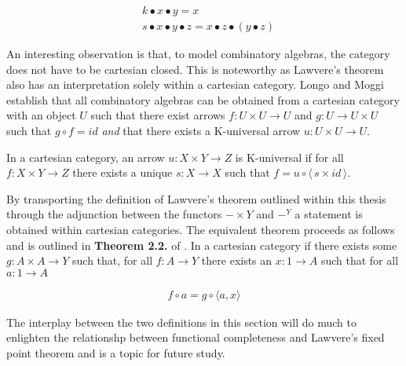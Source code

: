 \begin{align*}
    &k \bullet x \bullet y = x \\
    & s \bullet x \bullet y \bullet z = x \bullet z \bullet (y \bullet z)
\end{align*}

An interesting observation is that, to model combinatory algebras, the category
does not have to be cartesian closed.  This is noteworthy as Lawvere's theorem
also has an interpretation solely within a cartesian category. Longo and Moggi
establish that all combinatory algebras can be obtained from a cartesian
category with an object $U$ such that there exist arrows $f : U \times U
\rightarrow U$ and $g : U \rightarrow U \times U$ such that $g \circ f = id$
\textit{and} that there exists a K-universal arrow $u :U \times U
\rightarrow U$.

In a cartesian category, an arrow $u : X \times Y \rightarrow Z$ is K-universal
if for all $f : X \times Y \rightarrow Z$ there exists a unique $s : X
\rightarrow X$ such that $f = u \circ \langle \, s \times id \, \rangle$.

By transporting the definition of Lawvere's theorem outlined within this thesis
through the adjunction between the functors $-\times Y$ and $-^{Y}$ a statement
is obtained within cartesian categories. The equivalent theorem proceeds as
follows and is outlined in \textbf{Theorem 2.2.} of \cite{lawvere1969diagonal}.
In a cartesian category if there exists some $g : A \times A \rightarrow Y$ such
that, for all $f : A \rightarrow Y$ there exists an $x : 1 \rightarrow A$ such
that for all $a : 1 \rightarrow A$

\begin{align*}
    f \circ a = g \circ \langle a , x \rangle
\end{align*}

The interplay between the two definitions in this section will do much to
enlighten the relationshp between functional completeness and Lawvere's fixed
point theorem and is a topic for future study.
